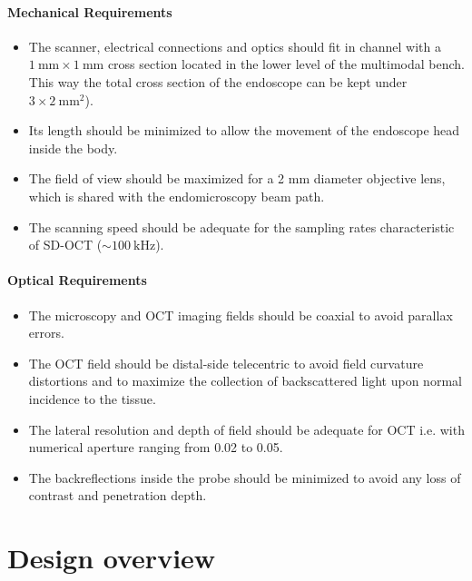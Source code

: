 \paragraph{Mechanical Requirements} 
\begin{itemize}

\item The scanner, electrical connections and optics should fit in channel with a $\SI{1}{\milli\meter} \times \SI{1}{\milli\meter}$ cross section located in the lower level of the multimodal bench. This way the total cross section of the endoscope can be kept under $3 \times \SI{2}{\milli\meter^2}$). 
\item Its length should be minimized to allow the movement of the endoscope head inside the body.
\item The field of view should be maximized for a 2 mm diameter objective lens, which is shared with the endomicroscopy beam path.
\item The scanning speed should be adequate for the sampling rates characteristic of SD-OCT ($\sim \SI{100}{\kilo\hertz} $).
\end{itemize}


\paragraph{Optical Requirements}

\begin{itemize}
\item The microscopy and OCT imaging fields should be coaxial to avoid parallax errors. 
\item The OCT field should be distal-side telecentric to avoid field curvature distortions and to maximize the collection of backscattered light upon normal incidence to the tissue.
\item The lateral resolution and depth of field should be adequate for OCT i.e. with numerical aperture ranging from 0.02 to 0.05.
\item The backreflections inside the probe should be minimized to avoid any loss of contrast and penetration depth.
\end{itemize}

  

\section{Design overview}

